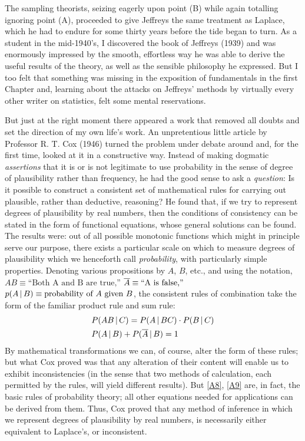 The sampling theorists, seizing eagerly upon point (B) while again totalling ignoring point (A), proceeded to give Jeffreys the same treatment as Laplace, which he had to endure for some thirty years before the tide began to turn. As a student in the mid-1940's, I discovered the book of Jeffreys (\cite{jeffreys}{1939}) and was enormously impressed by the smooth, effortless way he was able to derive the useful results of the theory, as well as the sensible philosophy he expressed.
But I too felt that something was missing in the exposition of fundamentals in the first Chapter and, learning about the attacks on Jeffreys’ methods by virtually every other writer on statistics, felt some mental reservations.

But just at the right moment there appeared a work that removed all doubts and set the direction of my own life's work.
An unpretentious little article by Professor R. T. Cox (\cite{cox}{1946}) turned the problem under debate around and, for the first time, looked at it in a constructive way.
Instead of making dogmatic \emph{assertions} that it is or is not legitimate to use probability in the sense of degree of plausibility rather than frequency, he had the good sense to ask a \emph{question}:
Is it possible to construct a consistent set of mathematical rules for carrying out plausible, rather than deductive, reasoning?
He found that, if we try to represent degrees of plausibility by real numbers, then the conditions of consistency can be stated in the form of functional equations, whose general solutions can be found.
The results were: out of all possible monotonic functions which might in principle serve our purpose, there exists a particular scale on which to measure degrees of plausibility which we henceforth call \emph{probability}, with particularly simple properties.
Denoting various propositions by $A$, $B$, etc., and using the notation, $AB\equiv\text{``Both A and B are true,''}$ $\overline{A}\equiv\text{``A is false,''}$ $p(A\,\vert\, B) \equiv \text{probability of $A$ given $B$}$, the consistent rules of combination take the form of the familiar product rule and sum rule:
\begin{align}
	&P(AB\,\vert\, C) = P(A\,\vert\, BC) \cdot P(B\,\vert\, C)\label{A8}\\
	&P(A\,\vert\, B) + P(\overline{A}\,\vert\, B) = 1\label{A9}
\end{align}
By mathematical transformations we can, of course, alter the form of these rules; but what Cox proved was that any alteration of their content will enable us to exhibit inconsistencies (in the sense that two methods of calculation, each permitted by the rules, will yield different results).
But \eqref{A8}, \eqref{A9} are, in fact, the basic rules of probability theory; all other equations needed for applications can be derived from them.
Thus, Cox proved that any method of inference in which we represent degrees of plausibility by real numbers, is necessarily either equivalent to Laplace's, or inconsistent.


